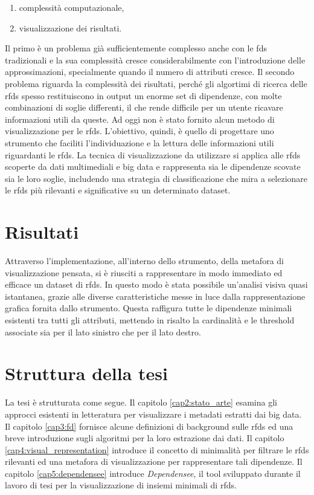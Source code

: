 \begin{enumerate}
    \item complessit\`{a} computazionale,
    \item visualizzazione dei risultati.
\end{enumerate}
Il primo \`{e} un problema gi\`{a} sufficientemente complesso anche con le \acrlong{fds} tradizionali e la sua complessit\`{a} cresce considerabilmente con l'introduzione delle approssimazioni, specialmente quando il numero di attributi cresce. Il secondo problema riguarda la complessit\`{a} dei risultati, perch\'{e} gli algortimi di ricerca delle \acrlong{rfds} spesso restituiscono in output un enorme set di dipendenze, con molte combinazioni di soglie differenti, il che rende difficile per un utente ricavare informazioni utili da queste. Ad oggi non \`{e} stato fornito alcun metodo di visualizzazione per le \acrlong{rfds}. L'obiettivo, quindi, \`{e} quello di progettare uno strumento che faciliti l'individuazione e la lettura delle informazioni utili riguardanti le \acrlong{rfds}. La tecnica di visualizzazione da utilizzare si applica alle \acrlong{rfds} scoperte da dati multimediali e big data e rappresenta sia le dipendenze scovate sia le loro soglie, includendo una strategia di classificazione che mira a selezionare le \acrlong{rfds} pi\`{u} rilevanti e significative su un determinato dataset.

\section{Risultati}
Attraverso l'implementazione, all'interno dello strumento, della metafora di visualizzazione pensata, si \`{e} riusciti a rappresentare in modo immediato ed efficace un dataset di \acrlong{rfds}. In questo modo \`{e} stata possibile un'analisi visiva quasi istantanea, grazie alle diverse caratteristiche messe in luce dalla rappresentazione grafica fornita dallo strumento. Questa raffigura tutte le dipendenze minimali esistenti tra tutti gli attributi, mettendo in risalto la cardinalit\`{a} e le threshold associate sia per il lato sinistro che per il lato destro.

\section{Struttura della tesi}
La tesi \`{e} strutturata come segue. Il capitolo \ref{cap2:stato_arte} esamina gli approcci esistenti in letteratura per visualizzare i metadati estratti dai big data. Il capitolo \ref{cap3:fd} fornisce alcune definizioni di background sulle \acrfull{rfds} ed una breve introduzione sugli algoritmi per la loro estrazione dai dati. Il capitolo \ref{cap4:visual_representation} introduce il concetto di minimalit\`{a} per filtrare le \acrfull{rfds} rilevanti ed una metafora di visualizzazione per rappresentare tali dipendenze. Il capitolo \ref{cap5:dependensee} introduce \textit{Dependensee}, il tool sviluppato durante il lavoro di tesi per la visualizzazione di insiemi minimali di \acrfull{rfds}.